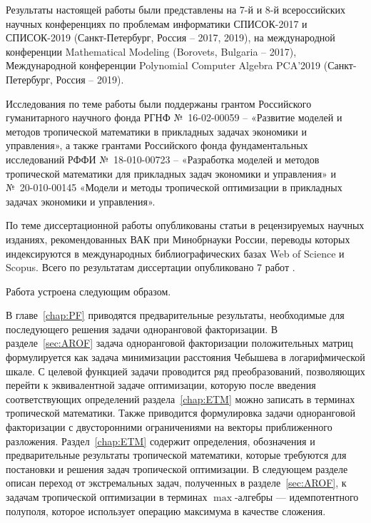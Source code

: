 \documentclass[specialist,
               substylefile = spbu.rtx,
               subf,href,colorlinks=true, 12pt]{disser}
\theoremstyle{definition}
\begin{document}
Результаты настоящей работы были представлены на 7-й и 8-й всероссийских научных конференциях по проблемам информатики СПИСОК-2017 и СПИСОК-2019 (Санкт-Петербург, Россия -- 2017, 2019), на международной конференции Mathematical Modeling (Borovets, Bulgaria -- 2017),
Международной конференции  Polynomial Computer Algebra PCA'2019 (Санкт-Петербург, Россия -- 2019). 

Исследования по теме работы были поддержаны грантом Российского гуманитарного научного фонда РГНФ №~16-02-00059 -- «Развитие моделей и методов тропической математики в прикладных задачах экономики и 
управления», а также грантами Российского фонда фундаментальных исследований РФФИ №~18-010-00723 -- «Разработка моделей и методов тропической математики для прикладных задач экономики и управления» и №~20-010-00145 «Модели и методы тропической оптимизации в прикладных задачах экономики и управления».

По теме диссертационной работы опубликованы статьи \cite{Krivulin2018RankoneRus, Krivulin2019OnRankoneRus} в рецензируемых научных изданиях, рекомендованных ВАК при Минобрнауки России, переводы которых \cite{Krivulin2018Rankone, Krivulin2019OnRankone} индексируются в международных библиографических базах Web of Science и Scopus.
Всего по результатам диссертации опубликовано 7 работ \cite{Krivulin2018RankoneRus, Krivulin2019OnRankoneRus,Krivulin2018Rankone, Krivulin2019OnRankone,Krivulin2017SPISOK, Krivulin2017Rankone, Krivulin2019Using}. 

Работа устроена следующим образом. 

В главе~\ref{chap:PF} приводятся предварительные результаты, необходимые для последующего решения задачи одноранговой факторизации.
В разделе~\ref{sec:AROF} задача одноранговой факторизации положительных матриц формулируется как задача минимизации расстояния Чебышева в логарифмической шкале. %
 С целевой функцией задачи проводится ряд преобразований, позволяющих перейти к эквивалентной задаче оптимизации, которую после введения соответствующих определений раздела~\ref{chap:ETM} можно записать в терминах тропической математики. Также приводится формулировка задачи одноранговой факторизации с двусторонними ограничениями на векторы приближенного разложения.  %
 Раздел~\ref{chap:ETM} содержит определения, обозначения и предварительные результаты тропической математики, которые требуются для постановки и решения задач тропической оптимизации. В следующем разделе описан переход от экстремальных задач, полученных в разделе~\ref{sec:AROF}, к задачам тропической оптимизации в терминах $\max$-алгебры --- идемпотентного полуполя, которое использует операцию максимума в качестве сложения.
\end{document}

